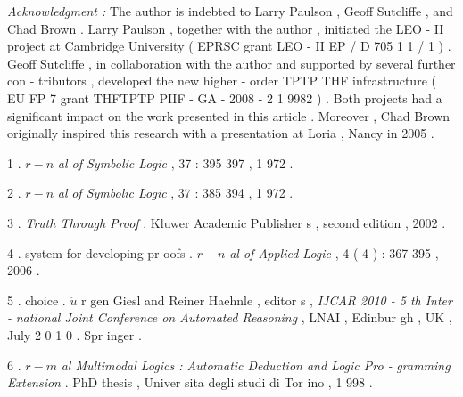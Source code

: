 \documentclass[10pt]{article}
\begin{document}
\noindent \textit{Acknowledgment : } The author is indebted to Larry Paulson , Geoff Sutcliffe , and 
 Chad Brown . \quad Larry Paulson , \quad together with the author , \quad initiated the LEO - II 
 project at Cambridge University ( EPRSC grant LEO - II EP / D 705 1 1 / 1 ) . Geoff 
 Sutcliffe , in collaboration with the author and supported by several further con - 
 tributors , developed the new higher - order TPTP THF infrastructure ( EU FP 7 
 grant THFTPTP PIIF - GA - 2008 - 2 1 9982 ) . Both projects had a significant impact 
 on the work presented in this article . Moreover , Chad Brown originally inspired 
 this research with a presentation at Loria , Nancy in 2005 . 


{\small 1 . }    $ r-n $  {\small \textit{al of Symbolic Logic } , } 
 {\small 37 : 395 397 , 1 972 . } 

{\small 2 . }   $ r-n $  {\small \textit{al } } 
 {\small \textit{of Symbolic Logic } , 37 : 385 394 , 1 972 . } 

{\small 3 . }   
 {\small \textit{Truth Through Proof } . Kluwer Academic Publisher s , second edition , 2002 . } 

{\small 4 . }     
 {\small system for developing pr oofs . }   $ r-n $  {\small \textit{al of Applied Logic } , 4 ( 4 ) : 367 395 , 2006 . } 

{\small 5 . }  
 {\small choice . }   $ \ddot{u} $  {\small r gen Giesl and Reiner Haehnle , editor s , \textit{IJCAR 2010 - 5 th Inter - } } 
 {\small \textit{national Joint Conference on Automated Reasoning } , LNAI , Edinbur gh , UK , July } 
 {\small 2 0 1 0 . Spr inger . } 

{\small 6 . }   $ r-m $  {\small \textit{al Multimodal Logics : Automatic Deduction and Logic Pro - } } 
 {\small \textit{gramming Extension } . PhD thesis , Univer sita degli studi di Tor ino , 1 998 . } 
\end{document}
